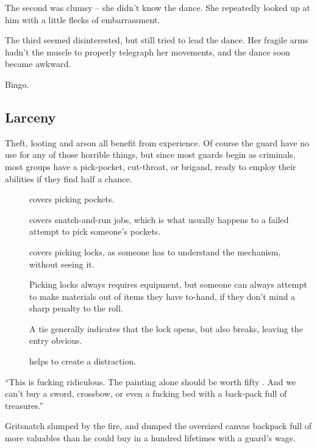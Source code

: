 \begin{multicols}{2}
\begin{exampletext}
  The second was clumsy -- she didn't know the dance.
  She repeatedly looked up at him with a little flecks of embarrassment.

  The third seemed disinterested, but still tried to lead the dance.
  Her fragile arms hadn't the muscle to properly telegraph her movements, and the dance soon became awkward.

  Bingo.
\end{exampletext}

\subsection{Larceny}

Theft, looting and arson all benefit from experience.
Of course the \gls{guard} have no use for any of those horrible things, but since most \glspl{guard} begin as criminals, most groups have a pick-pocket, cut-throat, or brigand, ready to employ their abilities if they find half a chance.

\begin{description}
  \item[]
    covers picking pockets.
  \item[]
    covers snatch-and-run jobs, which is what usually happens to a failed attempt to pick someone's pockets.
  \item[]
    covers picking locks, as someone has to understand the mechanism, without seeing it.

    Picking locks always requires equipment, but someone can always attempt to make materials out of items they have to-hand, if they don't mind a sharp penalty to the roll.

    A tie generally indicates that the lock opens, but also breaks, leaving the entry obvious.

  \item[]
    helps to create a distraction.
\end{description}

\begin{exampletext}
  ``This is fucking ridiculous.
  The painting alone should be worth fifty .
  And we can't buy a sword, crossbow, or even a fucking bed with a back-pack full of treasures.''

  Gritsnatch slumped by the fire, and dumped the oversized canvas backpack full of more valuables than he could buy in a hundred lifetimes with a \gls{guard}'s wage.


\end{exampletext}
\end{multicols}
